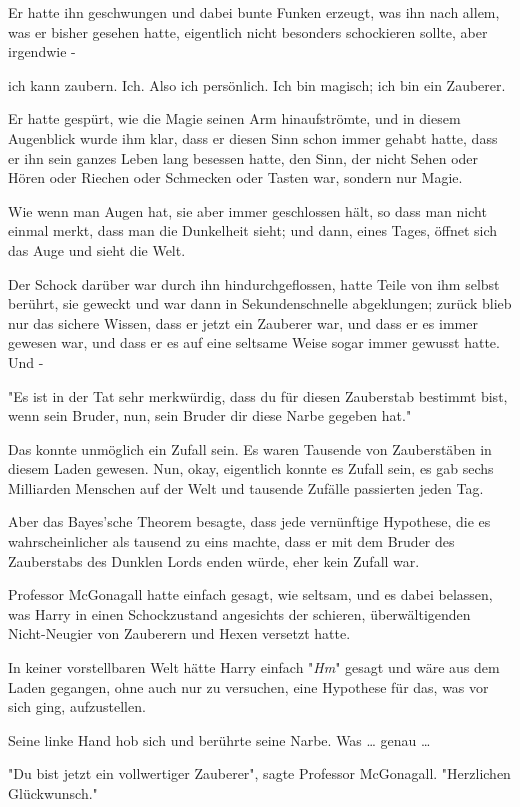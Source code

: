 {Er hatte ihn geschwungen und dabei bunte Funken erzeugt, was ihn nach allem, was er bisher gesehen hatte, eigentlich nicht besonders schockieren sollte, aber irgendwie -

ich kann zaubern. Ich. Also ich persönlich. Ich bin magisch; ich bin ein Zauberer.

Er hatte gespürt, wie die Magie seinen Arm hinaufströmte, und in diesem Augenblick wurde ihm klar, dass er diesen Sinn schon immer gehabt hatte, dass er ihn sein ganzes Leben lang besessen hatte, den Sinn, der nicht Sehen oder Hören oder Riechen oder Schmecken oder Tasten war, sondern nur Magie.

Wie wenn man Augen hat, sie aber immer geschlossen hält, so dass man nicht einmal merkt, dass man die Dunkelheit sieht; und dann, eines Tages, öffnet sich das Auge und sieht die Welt.

Der Schock darüber war durch ihn hindurchgeflossen, hatte Teile von ihm selbst berührt, sie geweckt und war dann in Sekundenschnelle abgeklungen; zurück blieb nur das sichere Wissen, dass er jetzt ein Zauberer war, und dass er es immer gewesen war, und dass er es auf eine seltsame Weise sogar immer gewusst hatte. Und -

"Es ist in der Tat sehr merkwürdig, dass du für diesen Zauberstab bestimmt bist, wenn sein Bruder, nun, sein Bruder dir diese Narbe gegeben hat."

Das konnte unmöglich ein Zufall sein. Es waren Tausende von Zauberstäben in diesem Laden gewesen. Nun, okay, eigentlich konnte es Zufall sein, es gab sechs Milliarden Menschen auf der Welt und tausende Zufälle passierten jeden Tag.

Aber das Bayes'sche Theorem besagte, dass jede vernünftige Hypothese, die es wahrscheinlicher als tausend zu eins machte, dass er mit dem Bruder des Zauberstabs des Dunklen Lords enden würde, eher kein Zufall war.

Professor McGonagall hatte einfach gesagt, wie seltsam, und es dabei belassen, was Harry in einen Schockzustand angesichts der schieren, überwältigenden Nicht-Neugier von Zauberern und Hexen versetzt hatte.

In keiner vorstellbaren Welt hätte Harry einfach "\emph{Hm}" gesagt und wäre aus dem Laden gegangen, ohne auch nur zu versuchen, eine Hypothese für das, was vor sich ging, aufzustellen.

Seine linke Hand hob sich und berührte seine Narbe. Was … genau …

"Du bist jetzt ein vollwertiger Zauberer", sagte Professor McGonagall. "Herzlichen Glückwunsch."

}
